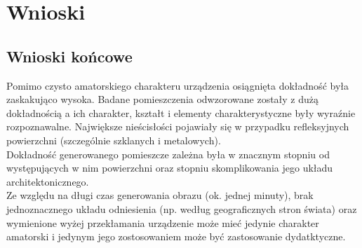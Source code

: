 \section {Wnioski}
\subsection {Wnioski końcowe}
Pomimo czysto amatorskiego charakteru urządzenia osiągnięta dokładność była zaskakująco wysoka. Badane pomieszczenia odwzorowane zostały z dużą dokładnością a ich charakter, kształt i elementy charakterystyczne były wyraźnie rozpoznawalne. Największe nieścisłości pojawiały się w przypadku refleksyjnych powierzchni (szczególnie szklanych i metalowych).\\

Dokładność generowanego pomieszcze zależna była w znacznym stopniu od występujących w nim powierzchni oraz stopniu skomplikowania jego układu architektonicznego.\\

Ze względu na długi czas generowania obrazu (ok. jednej minuty), brak jednoznacznego układu odniesienia (np. według geograficznych stron świata) oraz wymienione wyżej przekłamania urządzenie może mieć jedynie charakter amatorski i jedynym jego zostosowaniem może być zastosowanie dydatktyczne.